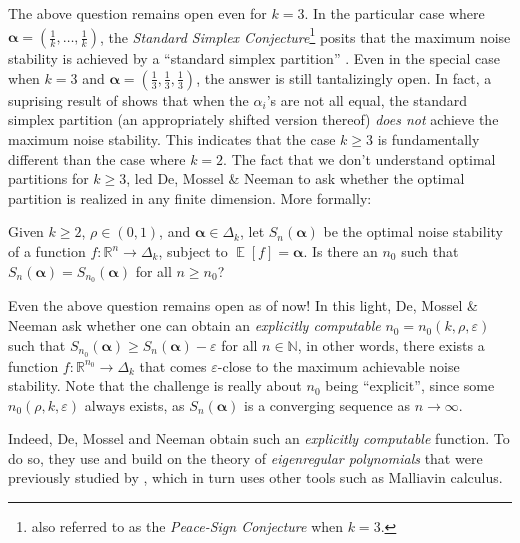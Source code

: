 \documentclass[11pt]{article}
\DeclareMathOperator*{\Ex}{\mathbb{E}}
\newcommand{\eps}{\varepsilon}
\newcommand{\bbN}{{\mathbb N}}
\newcommand{\bbR}{{\mathbb R}}
\newcommand{\balpha}{{\boldsymbol \alpha}}
\begin{document}
\vspace*{-0.2cm}

The above question remains open even for $k = 3$. In the particular case where $\balpha = (\frac{1}{k}, \ldots, \frac{1}{k})$, the {\em Standard Simplex Conjecture}\footnote{also referred to as the {\em Peace-Sign Conjecture} when $k =3$.} posits that the maximum noise stability is achieved by a ``standard simplex partition'' \cite{khot2007optimal, isaksson2012maximally}. Even in the special case when $k=3$ and $\balpha = (\frac{1}{3},\frac{1}{3},\frac{1}{3})$, the answer is still tantalizingly open. In fact, a suprising result of \cite{heilman2016standard} shows that when the $\alpha_i$'s are not all equal, the standard simplex partition (an appropriately shifted version thereof) \emph{does not} achieve the maximum noise stability. This indicates that the case $k \geq 3$ is fundamentally different than the case where $k = 2$. The fact that we don't understand optimal partitions for $k \ge 3$, led De, Mossel \& Neeman \cite{DMN_NoiseStabilityComputable} to ask whether the optimal partition is realized in any finite dimension. More formally:\\

\vspace*{-0.2cm}

 Given $k \ge 2$, $\rho \in (0,1)$, and $\balpha \in \Delta_k$, let $S_n(\balpha)$ be the optimal noise stability of a function $f : \bbR^n \to \Delta_k$, subject to $\Ex[f] = \balpha$. Is there an $n_0$ such that $S_n(\balpha) = S_{n_0}(\balpha)$ for all $n \ge n_0$?\\

\vspace*{-0.2cm}

Even the above question remains open as of now! In this light, De, Mossel \& Neeman \cite{DMN_NoiseStabilityComputable} ask whether one can obtain an {\em explicitly computable} $n_0 = n_0(k,\rho,\eps)$ such that $S_{n_0}(\balpha) \ge S_n(\balpha) - \eps$ for all $n \in \bbN$, in other words, there exists a function $f : \bbR^{n_0} \to \Delta_k$ that comes $\eps$-close to the maximum achievable noise stability. Note that the challenge is really about $n_0$ being ``explicit'', since some $n_0(\rho,k,\eps)$ always exists, as $S_n(\balpha)$ is a converging sequence as $n \to \infty$.

Indeed, De, Mossel and Neeman obtain such an {\em explicitly computable} function. To do so, they use and build on the theory of \emph{eigenregular polynomials} that were previously studied by \cite{de2014efficient}, which in turn uses other tools such as Malliavin calculus. 
\end{document}
